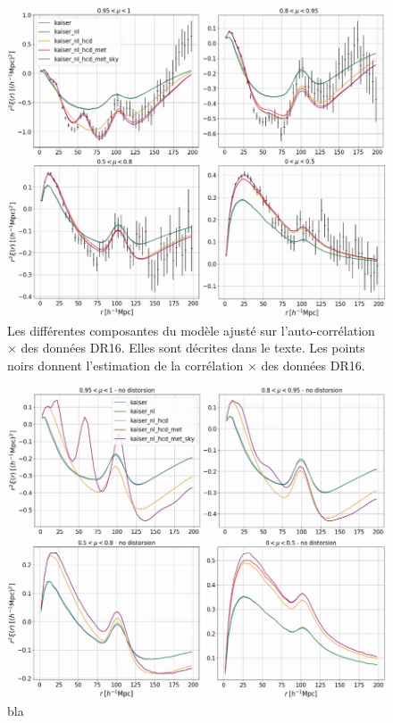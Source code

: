 \documentclass[11pt, twoside, a4paper, openright]{report}
\begin{document}
\begin{figure}
  \centering
  \includegraphics[scale=0.5]{cf_models}
  \caption{Les différentes composantes du modèle ajusté sur l'auto-corrélation \lya{}$\times$\lya{} des données DR16. Elles sont décrites dans le texte. Les points noirs donnent l'estimation de la corrélation \lya{}$\times$\lya{} des données DR16.}
  \label{fig:cf_models}
\end{figure}
\begin{figure}
  \centering
  \includegraphics[scale=0.5]{cf_models_no_dist}
  \caption{bla}
  \label{fig:cf_models_no_dist}
\end{figure}
\end{document}
